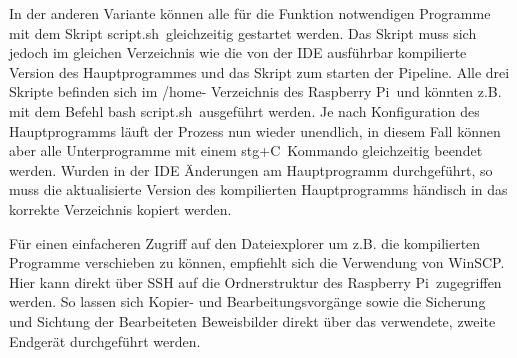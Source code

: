 In der anderen Variante können alle für die Funktion notwendigen Programme mit dem Skript \glqq script.sh\grqq\ gleichzeitig gestartet werden. Das Skript muss sich jedoch im gleichen Verzeichnis wie die von der IDE ausführbar kompilierte Version des Hauptprogrammes und das Skript zum starten der Pipeline. Alle drei Skripte befinden sich im /home- Verzeichnis des \glqq Raspberry Pi\grqq\  und könnten z.B. mit dem Befehl \glqq bash script.sh\grqq\ ausgeführt werden. Je nach Konfiguration des Hauptprogramms läuft der Prozess nun wieder unendlich, in diesem Fall können aber alle Unterprogramme mit einem \glqq stg+C\grqq\ Kommando gleichzeitig beendet werden. Wurden in der IDE Änderungen am Hauptprogramm durchgeführt, so muss die aktualisierte Version des kompilierten Hauptprogramms händisch in das korrekte Verzeichnis kopiert werden. 

Für einen einfacheren Zugriff auf den Dateiexplorer um z.B. die kompilierten Programme verschieben zu können, empfiehlt sich die Verwendung von \glqq WinSCP\grqq. Hier kann direkt über SSH auf die Ordnerstruktur des \glqq Raspberry Pi\grqq\ zugegriffen werden. So lassen sich Kopier- und Bearbeitungsvorgänge sowie die Sicherung und Sichtung der Bearbeiteten Beweisbilder direkt über das verwendete, zweite Endgerät durchgeführt werden.

